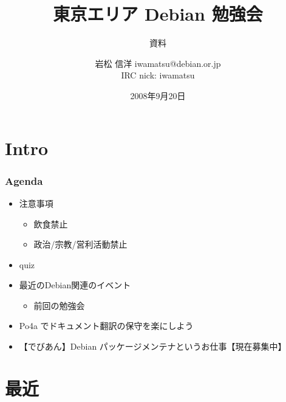 \documentclass[cjk,dvipdfmx,12pt]{beamer}
\title{東京エリア Debian 勉強会}
\subtitle{資料}
\author{岩松 信洋 iwamatsu@debian.or.jp\\IRC nick: iwamatsu}
\date{2008年9月20日}
\begin{document}
\frame{\titlepage{}}


\section{Intro}


\begin{frame}
 \frametitle{Agenda}
\begin{minipage}[t]{0.45\hsize}
  \begin{itemize}
  \item 注意事項
	\begin{itemize}
	 \item 飲食禁止
	 \item 政治/宗教/営利活動禁止
	\end{itemize}
  \item quiz
  \item 最近のDebian関連のイベント
	\begin{itemize}
	 \item 前回の勉強会 
	\end{itemize}
 \end{itemize}
\end{minipage} 
\begin{minipage}[t]{0.45\hsize}
 \begin{itemize}
  \item Po4a でドキュメント翻訳の保守を楽にしよう
  \item 【でびあん】Debian パッケージメンテナというお仕事【現在募集中】
 \end{itemize}
\end{minipage}
\end{frame}

\section{最近}
\end{document}

